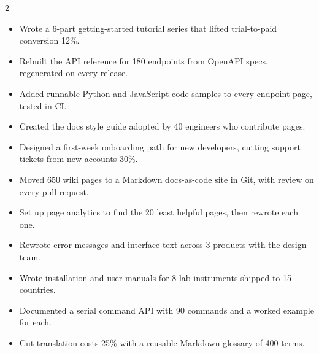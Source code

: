 \documentclass[10pt,a4paper,withhyper]{altacv}
\begin{document}


\makecvheader


\begin{paracol}{2}

\begin{itemize}
\item Wrote a 6-part getting-started tutorial series that lifted trial-to-paid conversion 12\%. %
\item Rebuilt the API reference for 180 endpoints from OpenAPI specs, regenerated on every release. %
\item Added runnable Python and JavaScript code samples to every endpoint page, tested in CI. %
\item Created the docs style guide adopted by 40 engineers who contribute pages. %
\end{itemize}

\divider

\begin{itemize}
\item Designed a first-week onboarding path for new developers, cutting support tickets from new accounts 30\%. %
\item Moved 650 wiki pages to a Markdown docs-as-code site in Git, with review on every pull request. %
\item Set up page analytics to find the 20 least helpful pages, then rewrote each one. %
\item Rewrote error messages and interface text across 3 products with the design team. %
\end{itemize}

\divider

\begin{itemize}
\item Wrote installation and user manuals for 8 lab instruments shipped to 15 countries. %
\item Documented a serial command API with 90 commands and a worked example for each. %
\item Cut translation costs 25\% with a reusable Markdown glossary of 400 terms. %
\end{itemize}


\end{paracol}
\end{document}
